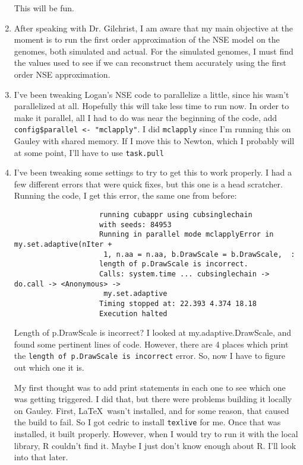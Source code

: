 \documentclass[12 pt]{article}
\begin{document}
\begin{enumerate}
				This will be fun.
				
				\item After speaking with Dr. Gilchrist, I am aware that my main objective at the moment is to run the first order approximation of the NSE model on the genomes, both simulated and actual. For the simulated genomes, I must find the values used to see if we can reconstruct them accurately using the first order NSE approximation.
				
				\item I've been tweaking Logan's NSE code to parallelize a little, since his wasn't parallelized at all. Hopefully this will take less time to run now. In order to make it parallel, all I had to do was near the beginning of the code, add \texttt{config\$parallel <- "mclapply"}. I did \texttt{mclapply} since I'm running this on Gauley with shared memory. If I move this to Newton, which I probably will at some point, I'll have to use \texttt{task.pull}
				
				\item I've been tweaking some settings to try to get this to work properly. I had a few different errors that were quick fixes, but this one is a head scratcher. Running the code, I get this error, the same one from before:
				\begin{verbatim}
					running cubappr using cubsinglechain 
					with seeds: 84953
					Running in parallel mode mclapplyError in my.set.adaptive(nIter +
					 1, n.aa = n.aa, b.DrawScale = b.DrawScale,  : 
					length of p.DrawScale is incorrect.
					Calls: system.time ... cubsinglechain -> do.call -> <Anonymous> ->
					 my.set.adaptive
					Timing stopped at: 22.393 4.374 18.18 
					Execution halted
				\end{verbatim}
				
				Length of p.DrawScale is incorrect? I looked at my.adaptive.DrawScale, and found some pertinent lines of code. However, there are 4 places which print the \texttt{length of p.DrawScale is incorrect} error. So, now I have to figure out which one it is.
				
				My first thought was to add print statements in each one to see which one was getting triggered. I did that, but there were problems building it locally on Gauley. First, \LaTeX\ wasn't installed, and for some reason, that caused the build to fail. So I got cedric to install \texttt{texlive} for me. Once that was installed, it built properly. However, when I would try to run it with the local library, R couldn't find it. Maybe I just don't know enough about R. I'll look into that later. 
				

\end{enumerate}
\end{document}

